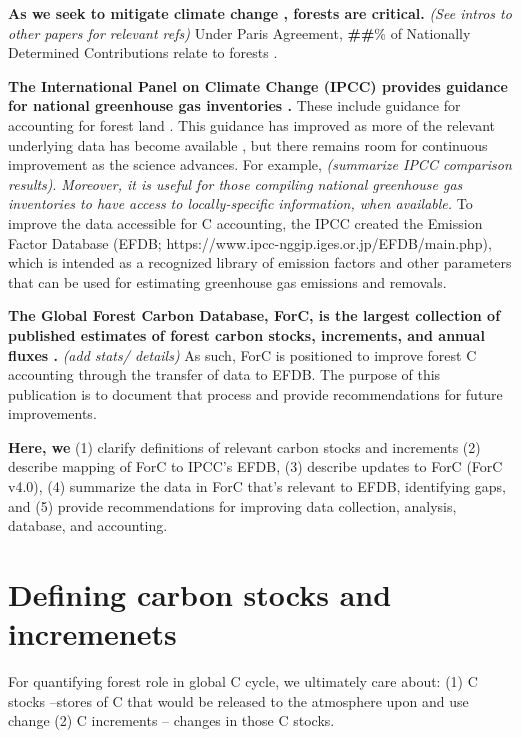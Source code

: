 \documentclass[, manuscript]{copernicus}
\begin{document}
\introduction[Introduction]

\textbf{As we seek to mitigate climate change
\citep{unfccc_adoption_2015}, forests are critical.} \emph{(See intros
to other papers for relevant refs)} Under Paris Agreement,
\textbf{\#\#}\% of Nationally Determined Contributions relate to forests
\citep{grassi_key_2017}.

\textbf{The International Panel on Climate Change (IPCC) provides
guidance for national greenhouse gas inventories \citep[(REFS for older
guidelines),][]{ipcc_2019_2019}.} These include guidance for accounting
for forest land \citep{ipcc_agriculture_2006, ipcc_2019_2019a}. This
guidance has improved as more of the relevant underlying data has become
available \citep{requenasuarez_estimating_2019}, but there remains room
for continuous improvement as the science advances. For example,
\citet{cook-patton_mapping_2020} \emph{(summarize IPCC comparison
results)}. \emph{Moreover, it is useful for those compiling national
greenhouse gas inventories to have access to locally-specific
information, when available.} To improve the data accessible for C
accounting, the IPCC created the Emission Factor Database (EFDB;
https://www.ipcc-nggip.iges.or.jp/EFDB/main.php), which is intended as a
recognized library of emission factors and other parameters that can be
used for estimating greenhouse gas emissions and removals.

\textbf{The Global Forest Carbon Database, ForC, is the largest
collection of published estimates of forest carbon stocks, increments,
and annual fluxes
\citep{anderson-teixeira_forc_2018, anderson-teixeira_carbon_2021}.}
\emph{(add stats/ details)} As such, ForC is positioned to improve
forest C accounting through the transfer of data to EFDB. The purpose of
this publication is to document that process and provide recommendations
for future improvements.

\textbf{Here, we} (1) clarify definitions of relevant carbon stocks and
increments (2) describe mapping of ForC to IPCC's EFDB, (3) describe
updates to ForC (ForC v4.0), (4) summarize the data in ForC that's
relevant to EFDB, identifying gaps, and (5) provide recommendations for
improving data collection, analysis, database, and accounting.

\section{Defining carbon stocks and incremenets}

For quantifying forest role in global C cycle, we ultimately care about:
(1) C stocks --stores of C that would be released to the atmosphere upon
and use change (2) C increments -- changes in those C stocks.
\end{document}
